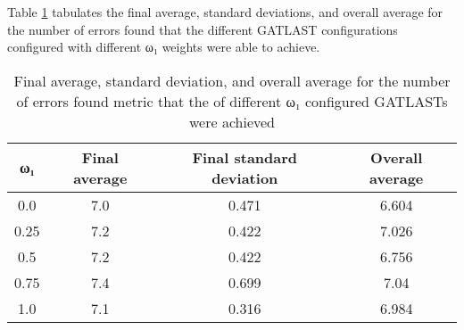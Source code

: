 Table \ref{tab:HP:GA:LTLWeight:number of errors found} tabulates the final average, standard deviations, and overall average for the number of errors found that the different GATLAST configurations configured with different ω₁ weights were able to achieve.
\begin{table}[tbh!]
\centering
\begin{adjustbox}{trim=0cm 0cm 0cm 0cm, clip=true}
\begin{tabular}{|c|c|c|c|}
\hline
ω₁ & Final average & Final standard deviation & Overall average\\
\hline
0.0 & 7.0 & 0.471 & 6.604\\\hline
0.25 & 7.2 & 0.422 & 7.026\\\hline
0.5 & 7.2 & 0.422 & 6.756\\\hline
0.75 & 7.4 & 0.699 & 7.04\\\hline
1.0 & 7.1 & 0.316 & 6.984\\\hline
\end{tabular}
\end{adjustbox}
\caption{Final average, standard deviation, and overall average for the number of errors found metric that the of different ω₁ configured GATLASTs were achieved}
\label{tab:HP:GA:LTLWeight:number of errors found}
\end{table}